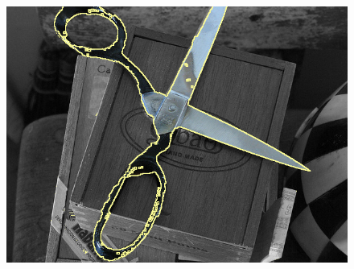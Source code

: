 \documentclass[review]{siamart220329}
\begin{document}
\begin{figure}[h!]
{\includegraphics[scale=0.12]{figures/coco-experiment/completion/scissors/gc-seg.png}
}%


\end{figure}
\end{document}
